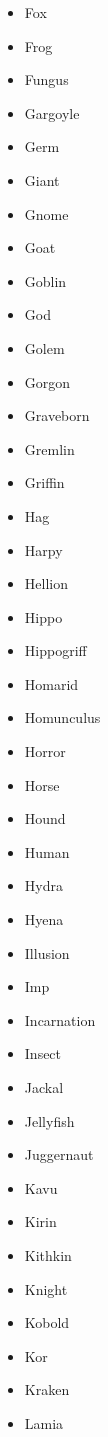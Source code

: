 \documentclass{article}
\begin{document}
\begin{multicols}{3}
\begin{itemize}
        \item Fox
        \item Frog
        \item Fungus
        \item Gargoyle
        \item Germ
        \item Giant
        \item Gnome
        \item Goat
        \item Goblin
        \item God
        \item Golem
        \item Gorgon
        \item Graveborn
        \item Gremlin
        \item Griffin
        \item Hag
        \item Harpy
        \item Hellion
        \item Hippo
        \item Hippogriff
        \item Homarid
        \item Homunculus
        \item Horror
        \item Horse
        \item Hound
        \item Human
        \item Hydra
        \item Hyena
        \item Illusion
        \item Imp
        \item Incarnation
        \item Insect
        \item Jackal
        \item Jellyfish
        \item Juggernaut
        \item Kavu
        \item Kirin
        \item Kithkin
        \item Knight
        \item Kobold
        \item Kor
        \item Kraken
        \item Lamia

\end{itemize}
\end{multicols}
\end{document}
